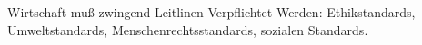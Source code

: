 Wirtschaft muß zwingend Leitlinen Verpflichtet Werden: Ethikstandards, Umweltstandards, Menschenrechtsstandards, sozialen Standards.